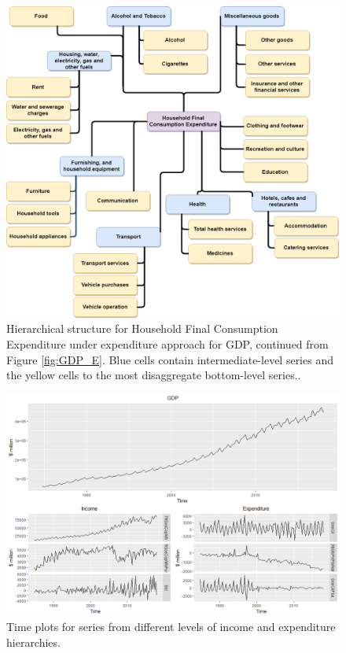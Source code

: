 \documentclass[graybox]{svmult}
\begin{document}
\begin{figure}[t]
	\centering
	\includegraphics[width=\textwidth]{Figs/HFCE.png}
	\caption{Hierarchical structure for Household Final Consumption Expenditure under expenditure approach for GDP, continued from Figure \ref{fig:GDP_E}. Blue cells contain intermediate-level series and the yellow cells to the most disaggregate bottom-level series..}\label{fig:HFCE}
\end{figure}



\begin{figure}[t]
	\centering
	\small
	\includegraphics[width = \textwidth]{Figs/TS-plots/TSplots-INC-EXP.png}
	\caption{Time plots for series from different levels of income and expenditure hierarchies.}\label{fig:TSplots-INC-EXP}
\end{figure}
\end{document}
